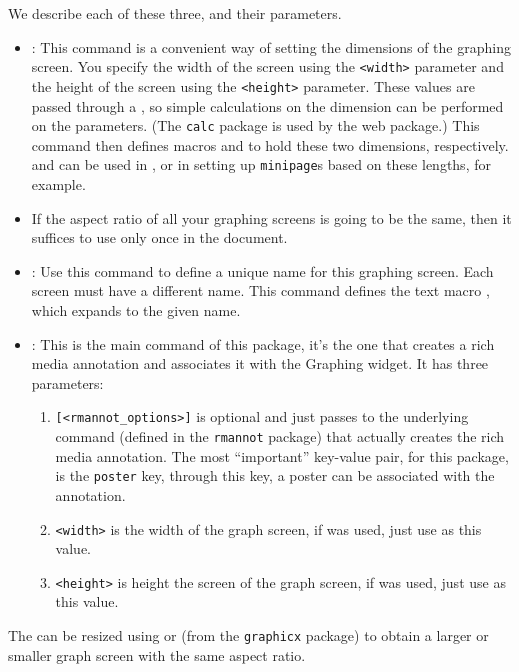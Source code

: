 \documentclass{article}
\begin{document}
\CmdDescription We describe each of these three, and their parameters.
\begin{itemize}
  \item {}: This command is a convenient way of setting the dimensions
  of the graphing screen. You specify the width of the screen using the \texttt{<width>}
  parameter and the height of the screen using the \texttt{<height>} parameter. These values
  are passed through a , so simple calculations on the dimension can be performed
  on the parameters. (The \texttt{calc} package is used by the web package.) This command then
  defines macros  and  to hold these two dimensions, respectively.
   and  can be used in , or in setting up
  \texttt{minipage}s based on these lengths, for example.

  \item[] If the aspect ratio of all your graphing screens is going to be the same, then
  it suffices to use  only once in the document.

  \item {}: Use this command to define a unique name for this graphing screen. Each
  screen must have a different name. This command defines the text macro , which
  expands to the given name.

  \item {}: This is the main command of this package,
  it's the one that creates a rich media annotation and associates
  it with the {\AcroFLeX} Graphing widget. It has three parameters:
  \begin{enumerate}
  \item \texttt{[<rmannot\_options>]} is optional and just passes to the underlying
      command  (defined in the \texttt{rmannot}
      package) that actually creates the rich media annotation.
      The most ``important'' key-value pair, for this package,
      is the \texttt{poster} key, through this key, a poster can
      be associated with the annotation.
  \item \texttt{<width>} is the width of the graph screen, if  was used,
  just use  as this value.
  \item \texttt{<height>} is height the screen of the graph screen, if  was used,
  just use  as this value.
  \end{enumerate}
\end{itemize}
The  can be resized using  or
 (from the \texttt{graphicx} package) to obtain a
larger or smaller graph screen with the same aspect ratio.
\end{document}
